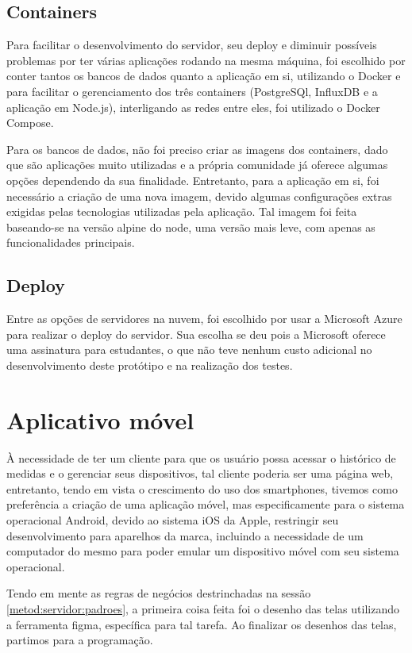\subsection{Containers}
\label{metod:servidor:containers}
Para facilitar o desenvolvimento do servidor, seu deploy e diminuir possíveis problemas por ter várias aplicações rodando na mesma máquina, foi escolhido por conter tantos os bancos de dados quanto a aplicação em si, utilizando o Docker e para facilitar o gerenciamento dos três containers (PostgreSQl, InfluxDB e a aplicação em Node.js), interligando as redes entre eles, foi utilizado o Docker Compose.

Para os bancos de dados, não foi preciso criar as imagens dos containers, dado que são aplicações muito utilizadas e a própria comunidade já oferece algumas opções dependendo da sua finalidade. Entretanto, para a aplicação em si, foi necessário a criação de uma nova imagem, devido algumas configurações extras exigidas pelas tecnologias utilizadas pela aplicação. Tal imagem foi feita baseando-se na versão alpine do node, uma versão mais leve, com apenas as funcionalidades principais.

\subsection{Deploy}
\label{metod:servidor:deploy}
Entre as opções de servidores na nuvem, foi escolhido por usar a Microsoft Azure para realizar o deploy do servidor. Sua escolha se deu pois a Microsoft oferece uma assinatura para estudantes, o que não teve nenhum custo adicional no desenvolvimento deste protótipo e na realização dos testes.

\section{Aplicativo móvel}
\label{metod:app}
À necessidade de ter um cliente para que os usuário  possa acessar o histórico de medidas e o gerenciar seus dispositivos, tal cliente poderia ser uma página web, entretanto, tendo em vista o crescimento do uso dos smartphones, tivemos como preferência a criação de uma aplicação móvel, mas especificamente para o sistema operacional Android, devido ao sistema iOS da Apple, restringir seu desenvolvimento para aparelhos da marca, incluindo a necessidade de um computador do mesmo para poder emular um dispositivo móvel com seu sistema operacional.

Tendo em mente as regras de negócios destrinchadas na sessão \ref{metod:servidor:padroes}, a primeira coisa feita foi o desenho das telas utilizando a ferramenta figma, específica para tal tarefa. Ao finalizar os desenhos das telas, partimos para a programação.

